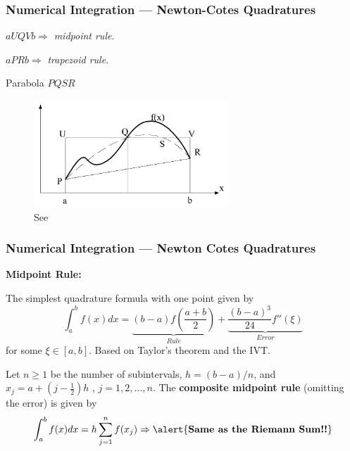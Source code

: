 \documentclass[11pt,xcolor={svgnames},aspectratio=169,usepdftitle=false]{beamer}
\let\toneitemize\itemize
\let\ttwoitemize\enditemize
\renewenvironment{itemize}{\toneitemize\addtolength{\itemsep}{0.7\baselineskip}}{\ttwoitemize}
\begin{document}
\begin{frame}
  \frametitle{Numerical Integration --- Newton-Cotes Quadratures}
  \begin{minipage}{0.3\textwidth}
  \begin{itemize}
    \item $aUQVb\Rightarrow$ \textit{midpoint rule}.
    \item $aPRb\Rightarrow$ \textit{trapezoid rule}.
    \item Parabola $PQSR$
  \end{itemize}
\end{minipage}
\begin{minipage}{0.69\textwidth}
  \begin{figure}
    \centering
    \includegraphics[width = 0.65\textwidth]{../figures/judd_newton_cotes.png}
    \caption{See \cite{judd1998numerical}}
  \end{figure}
\end{minipage}
\end{frame}

\begin{frame}
  \frametitle{Numerical Integration --- Newton Cotes Quadratures}
\alert{\textbf{Midpoint Rule:}}
\begin{itemize}
  \item The simplest quadrature formula with one point given by
  \[
  \int^b_a f(x)dx = \underset{Rule}{\underbrace{(b-a)f\left(\frac{a+b}{2}\right)}} + \underset{Error}{\underbrace{\frac{(b-a)^3}{24}f''(\xi)}}
  \]
  for some $\xi\in [a,b]$. Based on Taylor's theorem and the IVT.
  \item Let $n\geq 1$ be the number of subintervals, $h = (b -a) / n$, and $x_j = a + (j - \frac{1}{2})h$ , $j=1,2,\ldots,n$. The \alert{\textbf{composite midpoint rule}} {\tiny (omitting the error)} is given by
  \[
  \int^b_a f(x)dx = h\sum^n_{j=1}f(x_j) \Rightarrow \text{\alert{\textbf{Same as the Riemann Sum!!}}}
  \]
\end{itemize}
\end{frame}
\end{document}

